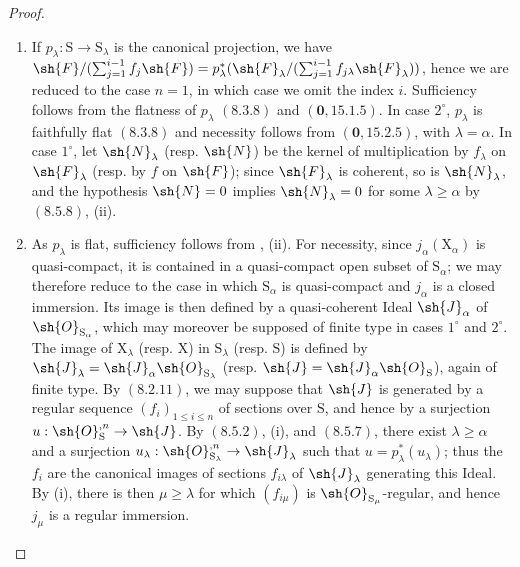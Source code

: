 \begin{proof}
\begin{enumerate}
\item[\rm(i)] If $p_\lambda:\mathrm{S}\to\mathrm{S}_\lambda$ is the canonical projection, we have $\sh{F}/(\sum_{j=1}^{i-1}f_j\sh{F})=p_\lambda^*(\sh{F}_\lambda/(\sum_{j=1}^{i-1}f_{j\lambda}\sh{F}_\lambda))$, hence we are reduced to the case $n=1$, in which case we omit the index $i$. Sufficiency follows from the flatness of $p_\lambda$ $(8.3.8)$ and $(\mathbf{0},15.1.5)$. In case $2^\circ$, $p_\lambda$ is faithfully flat $(8.3.8)$ and necessity follows from $(\mathbf{0},15.2.5)$, with $\lambda=\alpha$. In case $1^\circ$, let $\sh{N}_\lambda$ (resp. $\sh{N}$) be the kernel of multiplication by $f_\lambda$ on $\sh{F}_\lambda$ (resp. by $f$ on $\sh{F}$); since $\sh{F}_\lambda$ is coherent, so is $\sh{N}_\lambda$, and the hypothesis $\sh{N}=0$ implies $\sh{N}_\lambda=0$ for some $\lambda\geqslant\alpha$ by $(8.5.8)$, (ii).
\item[\rm(ii)] As $p_\lambda$ is flat, sufficiency follows from , (ii). For necessity, since $j_\alpha(\mathrm{X}_\alpha)$ is quasi-compact, it is contained in a quasi-compact open subset of $\mathrm{S}_\alpha$; we may therefore reduce to the case in which $\mathrm{S}_\alpha$ is quasi-compact and $j_\alpha$ is a closed immersion. Its image is then defined by a quasi-coherent Ideal $\sh{J}_\alpha$ of $\sh{O}_{\mathrm{S}_\alpha}$, which may moreover be supposed of finite type in cases $1^\circ$ and $2^\circ$. The image of $\mathrm{X}_\lambda$ (resp. $\mathrm{X}$) in $\mathrm{S}_\lambda$ (resp. $\mathrm{S}$) is defined by $\sh{J}_\lambda=\sh{J}_\alpha\sh{O}_{\mathrm{S}_\lambda}$ (resp. $\sh{J}=\sh{J}_\alpha\sh{O}_\mathrm{S}$), again of finite type. By $(8.2.11)$, we may suppose that $\sh{J}$ is generated by a regular sequence $(f_i)_{1\leqslant i\leqslant n}$ of sections over $\mathrm{S}$, and hence by a surjection $u:\sh{O}_\mathrm{S}^{,n}\to\sh{J}$. By $(8.5.2)$, (i), and $(8.5.7)$, there exist $\lambda\geqslant\alpha$ and a surjection $u_\lambda:\sh{O}_{\mathrm{S}_\lambda}^{,n}\to\sh{J}_\lambda$ such that $u=p_\lambda^*(u_\lambda)$; thus the $f_i$ are the canonical images of sections $f_{i\lambda}$ of $\sh{J}_\lambda$ generating this Ideal. By (i), there is then $\mu\geqslant\lambda$ for which $(f_{i\mu})$ is $\sh{O}_{\mathrm{S}_\mu}$-regular, and hence $j_\mu$ is a regular immersion.
\end{enumerate}
\end{proof}


